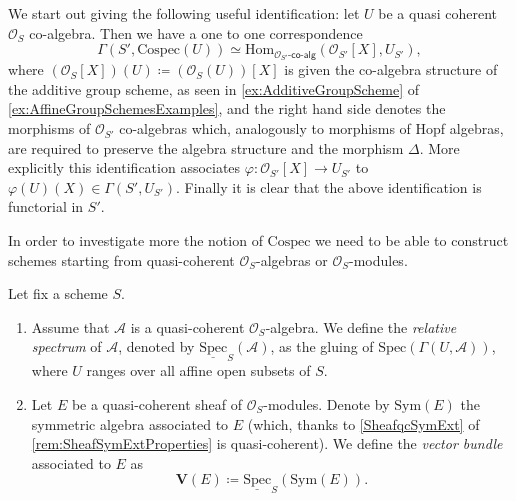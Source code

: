 \documentclass[../Main]{subfiles}
\begin{document}
\begin{rem}[]\label{rem:CospecSections}
	We start out giving the following useful identification:
	let $U$ be a quasi coherent $\mathcal{O}_{ S }$ co-algebra.
	Then we have a one to one correspondence
	\begin{equation*}
	\Gamma(S', \mathrm{Cospec}(U)) \simeq
	\mathrm{Hom}_{ \mathcal{O}_{ S' }\text{-}\mathsf{co}\text{-}\mathsf{alg}} 
	\left( \mathcal{O}_{ S' }[X], U_{S'} \right)
	,\end{equation*}
	where $(\mathcal{O}_{ S }[X])(U) \coloneqq (\mathcal{O}_{ S }(U))[X]$ 
	is given the co-algebra structure of the additive group scheme, as seen in
	\cref{ex:AdditiveGroupScheme} of \cref{ex:AffineGroupSchemesExamples},
	and the right hand side denotes the morphisms of $\mathcal{O}_{ S' }$
	co-algebras which, analogously to morphisms of Hopf algebras, 
	are required to preserve the algebra structure and the morphism $\Delta$.
	More explicitly this identification associates
	$\varphi\colon \mathcal{O}_{ S' }[X] \to U_{S'}$ to
	$\varphi(U)(X) \in \Gamma(S', U_{S'})$.
	Finally it is clear that the above identification is functorial in $S'$.
\end{rem}


\noindent
In order to investigate more the notion of $\mathrm{Cospec}$ we need to 
be able to construct schemes starting from quasi-coherent $\mathcal{O}_{ S }$-algebras
or $\mathcal{O}_{ S }$-modules.


\begin{defn}
	Let fix a scheme $S$.
\begin{enumerate}
	\item Assume that $\mathscr{A}$ is a quasi-coherent $\mathcal{O}_{ S }$-algebra.
		We define the {\em relative spectrum} of $\mathscr{A}$, denoted by
		$\underline{\mathrm{Spec}}_S(\mathscr{A})$, as the gluing of
		$\mathrm{Spec}(\Gamma(U, \mathscr{A}))$, where $U$ ranges
		over all affine open subsets of $S$.

	\item  Let $E$ be a quasi-coherent sheaf of $\mathcal{O}_{ S }$-modules.
		Denote by $\mathrm{Sym}(E)$ the symmetric algebra associated to 
		$E$ (which, thanks to \cref{SheafqcSymExt} of
		\cref{rem:SheafSymExtProperties} is quasi-coherent).
		We define the {\em vector bundle} associated to $E$ as
		\begin{equation*}
			\mathbf{V}(E) \coloneqq
			\underline{\mathrm{Spec}}_S (\mathrm{Sym}(E))
		.\end{equation*}
\end{enumerate}
\end{defn}
\end{document}
